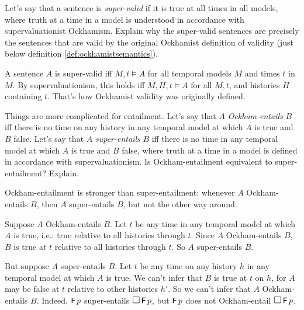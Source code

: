\begin{exercise}
  Let's say that a sentence is \emph{super-valid} if it is true at all times in
  all models, where truth at a time in a model is understood in accordance with
  supervaluationist Ockhamism. Explain why the super-valid sentences are
  precisely the sentences that are valid by the original Ockhamist definition of
  validity (just below definition \ref{def:ockhamistsemantics}).
\end{exercise}
\begin{solution}
  A sentence $A$ is super-valid iff $M,t \models A$ for all temporal models $M$
  and times $t$ in $M$. By supervaluationism, this holds iff $M,H,t \models A$
  for all $M,t$, and histories $H$ containing $t$. That's how Ockhamist validity was originally defined.
\end{solution}
\vspace{-2mm}
\begin{exercise}
  Things are more complicated for entailment. Let's say that $A$
  \emph{Ockham-entails} $B$ iff there is no time on any history in any temporal
  model at which $A$ is true and $B$ false. Let's say that $A$
  \emph{super-entails} $B$ iff there is no time in any temporal model at which
  $A$ is true and $B$ false, where truth at a time in a model is defined in
  accordance with supervaluationism. Is Ockham-entailment equivalent to
  super-entailment? Explain.
\end{exercise}
\begin{solution}
  Ockham-entailment is stronger than super-entailment: whenever $A$
  Ockham-entails $B$, then $A$ super-entails $B$, but not the other way around.

  Suppose $A$ Ockham-entails $B$. Let $t$ be any time in any temporal model at
  which $A$ is true, i.e.: true relative to all histories through $t$. Since $A$
  Ockham-entails $B$, $B$ is true at $t$ relative to all histories through
  $t$. So $A$ super-entails $B$.

  But suppose $A$ super-entails $B$. Let $t$ be any time on any history $h$ in
  any temporal model at which $A$ is true. We can't infer that $B$ is true at
  $t$ on $h$, for $A$ may be false at $t$ relative to other histories $h'$. So
  we can't infer that $A$ Ockham-entails $B$. Indeed, $\operatorname{\mathsf{F}} p$ super-entails
  $\Box \tF p$, but $\operatorname{\mathsf{F}} p$ does not Ockham-entail $\Box \tF p$.
\end{solution}



